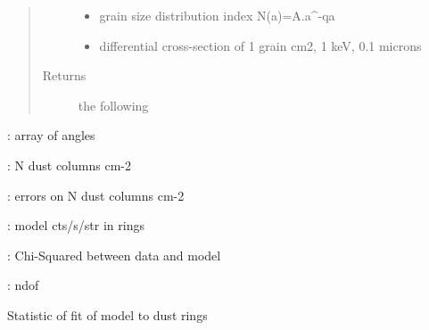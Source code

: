 \documentclass[letterpaper,10pt,english]{sphinxmanual}
\begin{document}
\begin{fulllineitems}
\begin{quote}
\begin{description}
\begin{itemize}
\item {} 
 \textendash{} grain size distribution index N(a)=A.a\textasciicircum{}-qa

\item {} 
 \textendash{} differential cross-section of 1 grain cm2, 1 keV, 0.1 microns

\end{itemize}

\item[{Returns}] \leavevmode
the following

\end{description}\end{quote}

\begin{DUlineblock}{0em}
\item[] :       array of angles
\item[] :      N dust columns cm-2
\item[] :      errors on N dust columns cm-2
\item[] :      model cts/s/str in rings
\item[] :      Chi-Squared between data and model
\item[] :       ndof
\end{DUlineblock}

\end{fulllineitems}


\begin{fulllineitems}
\label{\detokenize{xscat_functions:xscat.duststat}}
Statistic of fit of model to dust rings

\end{fulllineitems}

\end{document}

